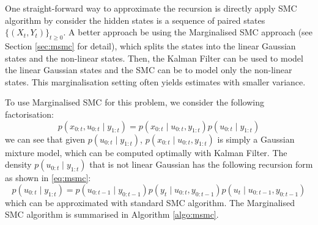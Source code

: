  
 
One straight-forward way to approximate the recursion is directly apply SMC algorithm by consider the hidden states is a sequence of paired states $\{(X_t, Y_t)\}_{t \geq 0}$. A better approach be using the Marginalised SMC approach (see Section \ref{sec:msmc} for detail), which splits the states into the linear Gaussian states and the non-linear states. Then, the Kalman Filter can be used to model the linear Gaussian states and the SMC can be to model only the non-linear states. This marginalisation setting often yields estimates with smaller variance.

To use Marginalised SMC for this problem, we consider the following factorisation:
\begin{equation}
  p(x_{0:t}, u_{0:t} \mid y_{1:t}) = p(x_{0:t} \mid u_{0:t}, y_{1:t}) p(u_{0:t} \mid y_{1:t})
\end{equation}
we can see that given $p(u_{0:t} \mid y_{1:t})$, $p(x_{0:t} \mid u_{0:t}, y_{1:t})$ is simply a Gaussian mixture model, which can be computed optimally with Kalman Filter. The density $p(u_{0:t} \mid y_{1:t})$ that is not linear Gaussian has the following recursion form as shown in \eqref{eq:msmc}:
\begin{equation}
p(u_{0:t} \mid y_{1:t}) = p(u_{0:t-1} \mid y_{0:t-1}) p(y_t \mid u_{0:t}, y_{0:t-1}) p(u_t \mid u_{0:t-1}, y_{0:t-1})
\end{equation}
which can be approximated with standard SMC algorithm. The Marginalised SMC algorithm is summarised in Algorithm \ref{algo:msmc}.
 
